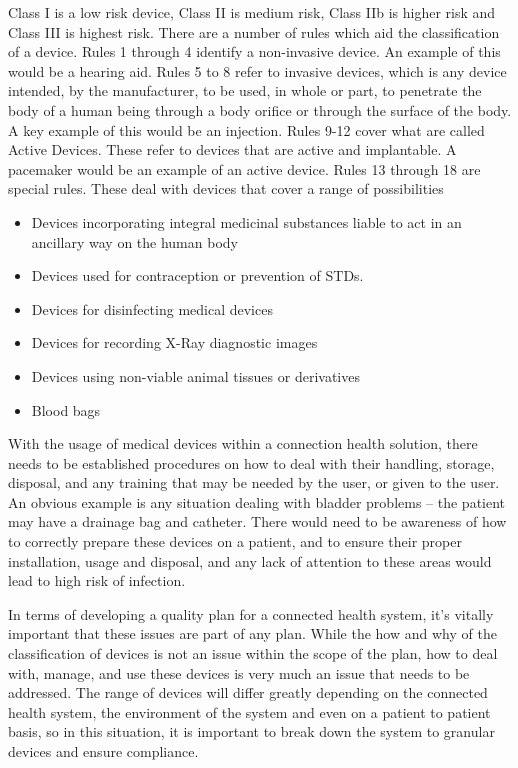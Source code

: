 Class I is a low risk device, Class II is medium risk, Class IIb is higher risk and Class III is highest risk. There are a number of rules which aid the classification of a device. Rules 1 through 4 identify a non-invasive device. An example of this would be a hearing aid. Rules 5 to 8 refer to invasive devices, which is any device intended, by the manufacturer, to be used, in whole or part, to penetrate the body of a human being through a body orifice or through the surface of the body. A key example of this would be an injection. Rules 9-12 cover what are called Active Devices. These refer to devices that are active and implantable. A pacemaker would be an example of an active device. Rules 13 through 18 are special rules. These deal with devices that cover a range of possibilities
\begin{itemize}
\item Devices incorporating integral medicinal substances liable to act in an ancillary way on the human body
\item Devices used for contraception or prevention of STDs.
\item Devices for disinfecting medical devices
\item Devices for recording X-Ray diagnostic images
\item Devices using non-viable animal tissues or derivatives
\item Blood bags
\end{itemize}

With the usage of medical devices within a connection health solution, there needs to be established procedures on how to deal with their handling, storage, disposal, and any training that may be needed by the user, or given to the user. An obvious example is any situation dealing with bladder problems – the patient may have a drainage bag and catheter. There would need to be awareness of how to correctly prepare these devices on a patient, and to ensure their proper installation, usage and disposal, and any lack of attention to these areas would lead to high risk of infection.

In terms of developing a quality plan for a connected health system, it’s vitally important that these issues are part of any plan. While the how and why of the classification of devices is not an issue within the scope of the plan, how to deal with, manage, and use these devices is very much an issue that needs to be addressed. The range of devices will differ greatly depending on the connected health system, the environment of the system and even on a patient to patient basis, so in this situation, it is important to break down the system to granular devices and ensure compliance.

